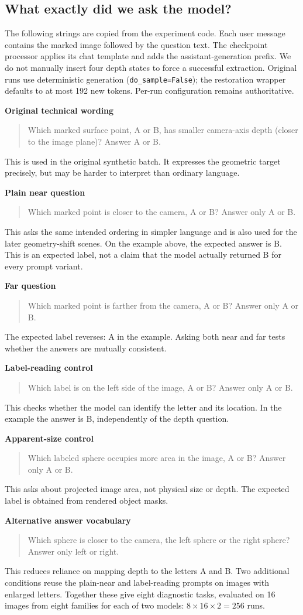 \documentclass[11pt]{article}
\newcommand{\prompt}[2]{\par\noindent\textbf{#1}\begin{quote}\small\raggedright\ttfamily #2\end{quote}}
\begin{document}
\subsection{What exactly did we ask the model?}
The following strings are copied from the experiment code. Each user message contains the marked image followed by the question text. The checkpoint processor applies its chat template and adds the assistant-generation prefix. We do not manually insert four depth states to force a successful extraction. Original runs use deterministic generation (\texttt{do\_sample=False}); the restoration wrapper defaults to at most 192 new tokens. Per-run configuration remains authoritative.

\prompt{Original technical wording}{Which marked surface point, A or B, has smaller camera-axis depth (closer to the image plane)? Answer A or B.}
This is used in the original synthetic batch. It expresses the geometric target precisely, but may be harder to interpret than ordinary language.

\prompt{Plain near question}{Which marked point is closer to the camera, A or B? Answer only A or B.}
This asks the same intended ordering in simpler language and is also used for the later geometry-shift scenes. On the example above, the expected answer is B. This is an expected label, not a claim that the model actually returned B for every prompt variant.

\prompt{Far question}{Which marked point is farther from the camera, A or B? Answer only A or B.}
The expected label reverses: A in the example. Asking both near and far tests whether the answers are mutually consistent.

\prompt{Label-reading control}{Which label is on the left side of the image, A or B? Answer only A or B.}
This checks whether the model can identify the letter and its location. In the example the answer is B, independently of the depth question.

\prompt{Apparent-size control}{Which labeled sphere occupies more area in the image, A or B? Answer only A or B.}
This asks about projected image area, not physical size or depth. The expected label is obtained from rendered object masks.

\prompt{Alternative answer vocabulary}{Which sphere is closer to the camera, the left sphere or the right sphere? Answer only left or right.}
This reduces reliance on mapping depth to the letters A and B. Two additional conditions reuse the plain-near and label-reading prompts on images with enlarged letters. Together these give eight diagnostic tasks, evaluated on 16 images from eight families for each of two models: $8\times16\times2=256$ runs.
\end{document}
